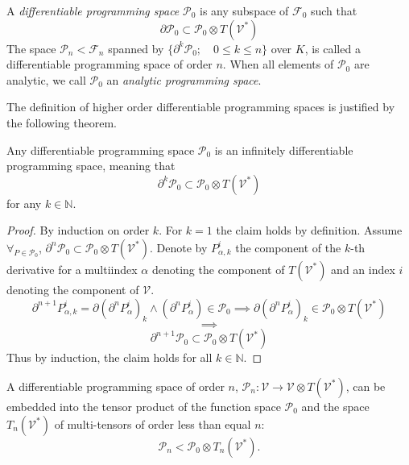 \documentclass[smallcondensed]{svjour3}
\newcommand{\VV}{\mathcal{V}}
\newcommand{\F}{\mathcal{F}}
\newcommand{\dP}{\mathcal{P}}
\newcommand{\D}{\partial}
\begin{document}
 
 \begin{definition}\label{def:dP}
 	A \emph{differentiable programming space} $\dP_0$ is any subspace of $\F_0$ such that
 	\begin{equation}\label{eq:P}
 	\D\dP_0\subset\dP_0\otimes T(\VV^*)
\end{equation}
The space $\dP_n<\F_n$ spanned by $\{\D^k\dP_0;\quad 0\le k\le n\}$ over $K$, is
called a differentiable programming space of order $n$. When all elements of
$\dP_0$ are analytic, we call $\dP_0$ an \emph{analytic programming space}. 
 \end{definition}
The definition of higher order differentiable programming spaces is justified by the following theorem. 
\begin{theorem}\label{izr:P}
	Any differentiable programming space $\dP_0$ is an
  infinitely differentiable programming space, meaning that
	\begin{equation}\label{eq:P_n}
	 		\D^k\dP_0\subset\dP_0\otimes T(\VV^*)
	 	\end{equation}
for any $k\in\mathbb{N}$.
\end{theorem}
\begin{proof} By induction on order $k$. For $k=1$ the claim holds by definition. Assume	$\forall_{P\in\dP_0}$,
  $\D^n\dP_0\subset\dP_0\otimes T(\VV^*)$. Denote by $P_{\alpha,k}^i$ the
  component of the $k$-th derivative for a multiindex $\alpha$  denoting the
  component of $T(\VV^*)$ and an index $i$ denoting the component of $\VV$.
	\begin{equation}\label{eq:inductionStep}
\D^{n+1}P_{\alpha,k}^i=\D(\D^n P^i_\alpha)_k\land(\D^n P^i_\alpha)\in\dP_0\implies \D(\D^n P^i_\alpha)_k\in \dP_0\otimes T(\VV^*)
	\end{equation}
	$$\implies$$
	$$\D^{n+1}\dP_0\subset\dP_0\otimes T(\VV^*)$$
Thus by induction, the claim holds for all $k\in \mathbb{N}$. 
\end{proof}



 \begin{corollary}\label{izr:P_n}
 	A differentiable programming space of order $n$, $\dP_n:\VV\to \VV\otimes
  T(\VV^*)$, can be embedded into the tensor 
  product of the function space $\dP_0$ and the space $T_n(\VV^*)$ of
  multi-tensors of order less than equal $n$:
  \begin{equation}
    \label{eq:D_p_embed}
    \dP_n<\dP_0\otimes T_n(\VV^*).
  \end{equation}
 \end{corollary}
 
\end{document}
